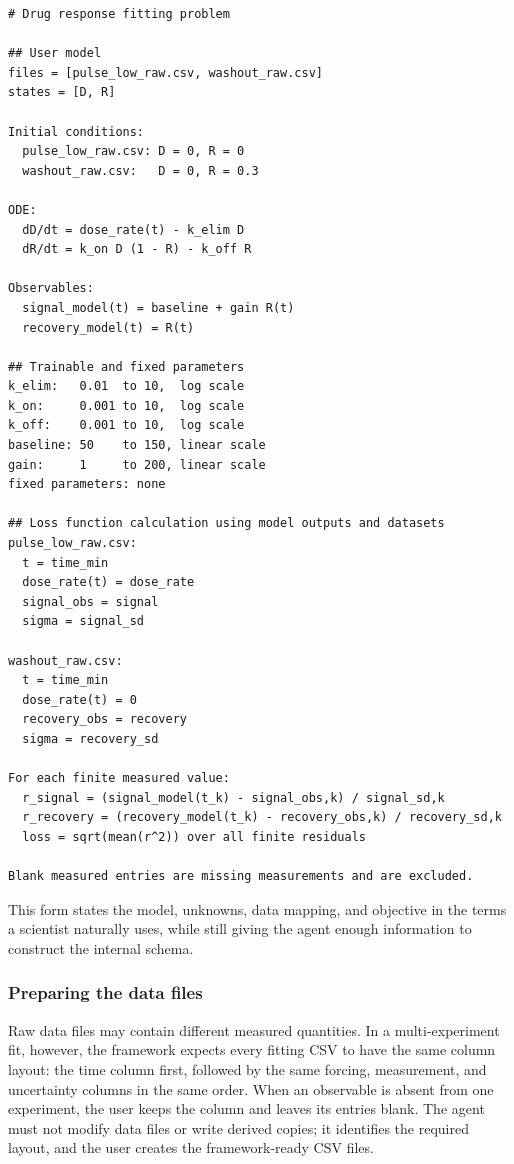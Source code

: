 \begin{verbatim}
# Drug response fitting problem

## User model
files = [pulse_low_raw.csv, washout_raw.csv]
states = [D, R]

Initial conditions:
  pulse_low_raw.csv: D = 0, R = 0
  washout_raw.csv:   D = 0, R = 0.3

ODE:
  dD/dt = dose_rate(t) - k_elim D
  dR/dt = k_on D (1 - R) - k_off R

Observables:
  signal_model(t) = baseline + gain R(t)
  recovery_model(t) = R(t)

## Trainable and fixed parameters
k_elim:   0.01  to 10,  log scale
k_on:     0.001 to 10,  log scale
k_off:    0.001 to 10,  log scale
baseline: 50    to 150, linear scale
gain:     1     to 200, linear scale
fixed parameters: none

## Loss function calculation using model outputs and datasets
pulse_low_raw.csv:
  t = time_min
  dose_rate(t) = dose_rate
  signal_obs = signal
  sigma = signal_sd

washout_raw.csv:
  t = time_min
  dose_rate(t) = 0
  recovery_obs = recovery
  sigma = recovery_sd

For each finite measured value:
  r_signal = (signal_model(t_k) - signal_obs,k) / signal_sd,k
  r_recovery = (recovery_model(t_k) - recovery_obs,k) / recovery_sd,k
  loss = sqrt(mean(r^2)) over all finite residuals

Blank measured entries are missing measurements and are excluded.
\end{verbatim}

This form states the model, unknowns, data mapping, and objective in the terms a
scientist naturally uses, while still giving the agent enough information to
construct the internal schema.


\subsubsection{Preparing the data files}

Raw data files may contain different measured quantities. In a multi-experiment
fit, however, the framework expects every fitting CSV to have the same column
layout: the time column first, followed by the same forcing, measurement, and
uncertainty columns in the same order. When an observable is absent from one
experiment, the user keeps the column and leaves its entries blank. The agent
must not modify data files or write derived copies; it identifies the required
layout, and the user creates the framework-ready CSV files.

